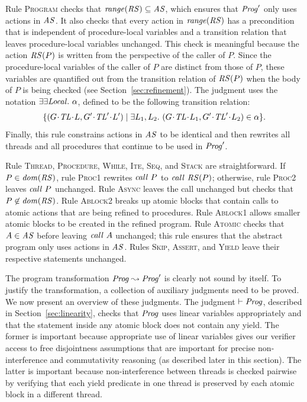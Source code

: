 Rule \textsc{Program} checks that $\mathit{range}(\mathit{RS}) \subseteq \mathit{AS}$,
which ensures that $\mathit{Prog}'$ only uses actions in $\mathit{AS}$.
It also checks that every action in $\mathit{range}(\mathit{RS})$ has a precondition 
that is independent of procedure-local variables and a transition relation that leaves 
procedure-local variables unchanged.  
This check is meaningful because the action $\mathit{RS}(P)$ is written from the 
perspective of the caller of $P$.
Since the procedure-local variables of the caller of $P$ are distinct from those of $P$,
these variables are quantified out from the transition relation of $\mathit{RS}(P)$ when 
the body of $P$ is being checked (see Section~\ref{sec:refinement}).
The judgment uses the notation $\exists\exists {\mathit{Local}}.\ \alpha$, defined to be the following transition relation:
\[\{(\MakeStore{\varsG}{\varsTL}{\varsL}, \MakeStore{\varsG'}{\varsTL'}{\varsL'}) \mid \exists \varsL_1,\varsL_2.\ (\MakeStore{\varsG}{\varsTL}{\varsL_1}, \MakeStore{\varsG'}{\varsTL'}{\varsL_2}) \in \alpha \}.\]
Finally, this rule constrains actions in $\mathit{AS}$ to be identical and then rewrites all threads
and all procedures that continue to be used in $\mathit{Prog}'$.

Rule \textsc{Thread}, \textsc{Procedure}, \textsc{While}, \textsc{Ite}, \textsc{Seq}, and \textsc{Stack} are straightforward.
If $P \in \mathit{dom}(\mathit{RS})$, rule \textsc{Proc1} rewrites $\mathit{call}\ P$ to $\mathit{call}\ \mathit{RS}(P)$;
otherwise, rule \textsc{Proc2} leaves $\mathit{call}\ P$ unchanged.
Rule \textsc{Async} leaves the call unchanged but checks that $P \not \in \mathit{dom}(\mathit{RS})$.
Rule \textsc{Ablock2} breaks up atomic blocks that contain calls
to atomic actions that are being refined to procedures.
Rule \textsc{Ablock1} allows smaller atomic blocks to be created in the refined program.
Rule \textsc{Atomic} checks that $A \in \mathit{AS}$ before leaving $\mathit{call}\ A$ unchanged;
this rule ensures that the abstract program only uses actions in $\mathit{AS}$.
Rules \textsc{Skip}, \textsc{Assert}, and \textsc{Yield} leave their respective statements unchanged.

The program transformation $\mathit{Prog} \leadsto \mathit{Prog}'$ is clearly not sound by itself.
To justify the transformation, a collection of auxiliary judgments need to be proved.
We now present an overview of these judgments.
The judgment $\vdash \mathit{Prog}$, described in Section~\ref{sec:linearity}, 
checks that $\mathit{Prog}$ uses linear variables appropriately and that the statement
inside any atomic block does not contain any yield.
The former is important because appropriate use of linear variables gives our verifier access to free disjointness
assumptions that are important for precise non-interference and commutativity reasoning (as described later in this section).
The latter is important because non-interference between threads is checked pairwise by verifying that each yield predicate
in one thread is preserved by each atomic block in a different thread.

